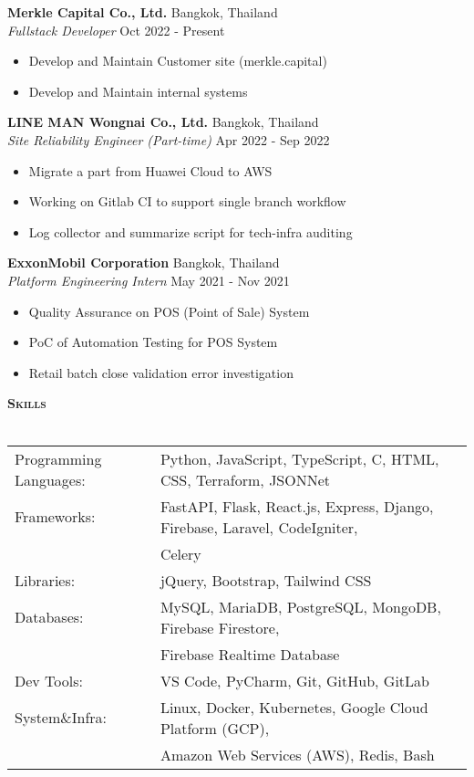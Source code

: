 \documentclass[a4paper]{article}
\newcommand{\lineunder} {
    \vspace*{-8pt} \\
    \hspace*{-18pt} \hrulefill \\
}
\newcommand{\header} [1] {
    {\hspace*{-18pt}\vspace*{6pt} \textsc{\textbf{#1}}}
    \vspace*{-6pt} \lineunder
}
\begin{document}
\textbf{Merkle Capital Co., Ltd.} \hfill Bangkok, Thailand\\
\textit{Fullstack Developer} \hfill Oct 2022 - Present\\
\vspace{-1mm}
\begin{itemize} \itemsep 1pt
	\item Develop and Maintain Customer site (merkle.capital)
	\item Develop and Maintain internal systems
\end{itemize}
\textbf{LINE MAN Wongnai Co., Ltd.} \hfill Bangkok, Thailand\\
\textit{Site Reliability Engineer (Part-time)} \hfill Apr 2022 - Sep 2022\\
\vspace{-1mm}
\begin{itemize} \itemsep 1pt
	\item Migrate a part from Huawei Cloud to AWS
	\item Working on Gitlab CI to support single branch workflow
	\item Log collector and summarize script for tech-infra auditing
\end{itemize}
\textbf{ExxonMobil Corporation} \hfill Bangkok, Thailand\\
\textit{Platform Engineering Intern} \hfill May 2021 - Nov 2021\\
\vspace{-1mm}
\begin{itemize} \itemsep 1pt
	\item Quality Assurance on POS (Point of Sale) System
	\item PoC of Automation Testing for POS System
	\item Retail batch close validation error investigation
\end{itemize}

\header{Skills}
\begin{tabular}{ l l }
	Programming Languages: & Python, JavaScript, TypeScript, C, HTML, CSS, Terraform, JSONNet                         \\
	Frameworks:            & FastAPI, Flask, React.js, Express, Django, Firebase, Laravel, CodeIgniter,  \\ & Celery        \\
	Libraries:             & jQuery, Bootstrap, Tailwind CSS                                                          \\
	Databases:             & MySQL, MariaDB, PostgreSQL, MongoDB, Firebase Firestore, \\ & Firebase Realtime Database      \\
	Dev Tools:             & VS Code, PyCharm, Git, GitHub, GitLab                                                    \\
	System\&Infra:         & Linux, Docker, Kubernetes, Google Cloud Platform (GCP), \\ & Amazon Web Services (AWS), Redis, Bash \\
\end{tabular}
\vspace{4mm}
\end{document}
